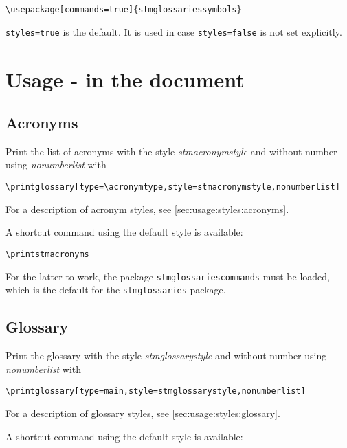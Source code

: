 \documentclass[%
  type=article,%
  layout=koma,%
  hyperref=true,%
  conditionallox=true,%
  conditionalloxnewpage=false,%
  date=true,%
  index=true,%
  listings=true%
]{stmtext}
\begin{document}
\begin{verbatim}
\usepackage[commands=true]{stmglossariessymbols}
\end{verbatim}

\texttt{styles=true} is the default. It is used in case \texttt{styles=false} is not set explicitly.

\section{Usage - in the document}
\label{sec:usage:document}

\subsection{Acronyms}
\label{sec:usage:document:acronyms}

Print the list of acronyms with the style \textit{stmacronymstyle} and without number using \textit{nonumberlist} with

\begin{verbatim}
\printglossary[type=\acronymtype,style=stmacronymstyle,nonumberlist]
\end{verbatim}

For a description of acronym styles, see \autoref{sec:usage:styles:acronyms}.

A shortcut command using the default style is available:

\begin{verbatim}
\printstmacronyms
\end{verbatim}

For the latter to work, the package \texttt{stmglossariescommands} must be loaded, which is the default for the \texttt{stmglossaries} package.

\subsection{Glossary}
\label{sec:usage:document:glossary}

Print the glossary with the style \textit{stmglossarystyle} and without number using \textit{nonumberlist} with

\begin{verbatim}
\printglossary[type=main,style=stmglossarystyle,nonumberlist]
\end{verbatim}

For a description of glossary styles, see \autoref{sec:usage:styles:glossary}.

A shortcut command using the default style is available:
\end{document}
